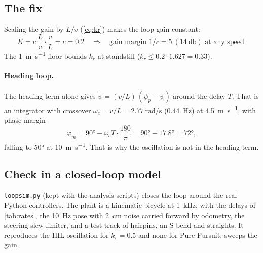 \documentclass[11pt,a4paper]{article}
\begin{document}
\subsection{The fix}
Scaling the gain by $L/v$ (\cref{eq:kr}) makes the loop gain constant:
\begin{equation}
K = c\,\frac{L}{v}\cdot\frac{v}{L} = c = 0.2
\quad\Rightarrow\quad \text{gain margin } 1/c = 5 \ (\SI{14}{\decibel}) \text{ at any speed.}
\end{equation}
The \SI{1}{\metre\per\second} floor bounds $k_r$ at standstill
($k_r \le 0.2 \cdot 1.627 = 0.33$).

\paragraph{Heading loop.} The heading term alone gives
$\dot\psi = (v/L)\,(\psi_p - \psi)$ around the delay $T$. That is an integrator with
crossover $\omega_c = v/L = \SI{2.77}{\radian\per\second}$ (\SI{0.44}{\hertz}) at
\SI{4.5}{\metre\per\second}, with phase margin
\begin{equation}
\varphi_m = \ang{90} - \omega_c T \cdot \frac{180}{\pi} = \ang{90} - \ang{17.8} = \ang{72},
\end{equation}
falling to \ang{50} at \SI{10}{\metre\per\second}. That is why the oscillation is not in
the heading term.

\subsection{Check in a closed-loop model}
\texttt{loopsim.py} (kept with the analysis scripts) closes the loop around the real
Python controllers. The plant is a kinematic bicycle at \SI{1}{\kilo\hertz}, with the
delays of \cref{tab:rates}, the 10~Hz pose with \SI{2}{\centi\metre} noise carried forward
by odometry, the steering slew limiter, and a test track of hairpins, an S-bend and
straights. It reproduces the HIL oscillation for $k_r = 0.5$ and none for Pure Pursuit.
 sweeps the gain.
\end{document}
